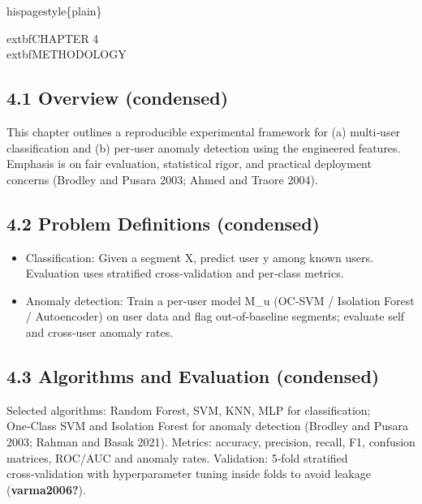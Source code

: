 \documentclass[
  11pt,
  a4paper,
]{article}
\providecommand{\tightlist}{%
  \setlength{\itemsep}{0pt}\setlength{\parskip}{0pt}}
\begin{document}
\newpage

\newpage

hispagestyle\{plain\}

\begin{center}
\vspace*{2cm}
    extbf{\Large CHAPTER 4}\\[0.5cm]
    extbf{\Large METHODOLOGY}
\end{center}

\newpage

\subsection{4.1 Overview (condensed)}\label{overview-condensed}

This chapter outlines a reproducible experimental framework for (a)
multi‑user classification and (b) per‑user anomaly detection using the
engineered features. Emphasis is on fair evaluation, statistical rigor,
and practical deployment concerns (Brodley and Pusara 2003; Ahmed and
Traore 2004).

\subsection{4.2 Problem Definitions
(condensed)}\label{problem-definitions-condensed}

\begin{itemize}
\tightlist
\item
  Classification: Given a segment X, predict user y among known users.
  Evaluation uses stratified cross‑validation and per‑class metrics.
\item
  Anomaly detection: Train a per‑user model M\_u (OC‑SVM / Isolation
  Forest / Autoencoder) on user data and flag out‑of‑baseline segments;
  evaluate self and cross‑user anomaly rates.
\end{itemize}

\subsection{4.3 Algorithms and Evaluation
(condensed)}\label{algorithms-and-evaluation-condensed}

Selected algorithms: Random Forest, SVM, KNN, MLP for classification;
One‑Class SVM and Isolation Forest for anomaly detection (Brodley and
Pusara 2003; Rahman and Basak 2021). Metrics: accuracy, precision,
recall, F1, confusion matrices, ROC/AUC and anomaly rates. Validation:
5‑fold stratified cross‑validation with hyperparameter tuning inside
folds to avoid leakage (\textbf{varma2006?}).
\end{document}
